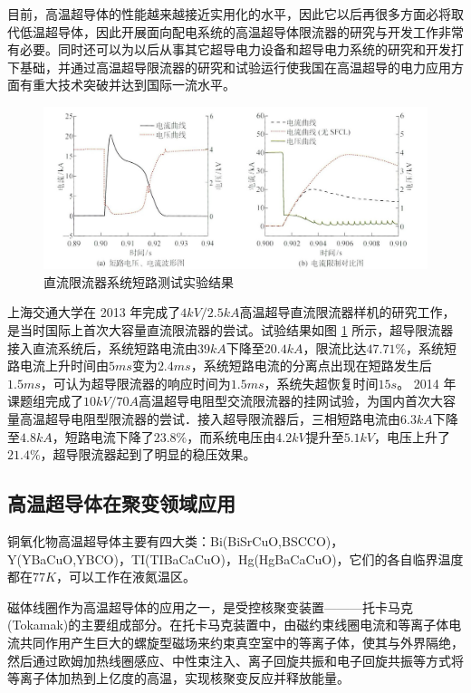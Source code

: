 \documentclass[UTF8, twocolumn]{ctexart}
\begin{document}
    目前，高温超导体的性能越来越接近实用化的水平，因此它以后再很多方面必将取代低温超导体，因此开展面向配电系统的高温超导体限流器的研究与开发工作非常有必要。同时还可以为以后从事其它超导电力设备和超导电力系统的研究和开发打下基础，并通过高温超导限流器的研究和试验运行使我国在高温超导的电力应用方面有重大技术突破并达到国际一流水平\cite{肖立业1999超导限流器}。

    \begin{figure}[hb]
        \centering
        \includegraphics[scale=1.2]{image/直流限流器系统短路测试实验结果.jpg}
        \caption{直流限流器系统短路测试实验结果}
        \label{fig:image5}
    \end{figure}

    上海交通大学在 2013 年完成了$4kV/2.5kA$高温超导直流限流器样机的研究工作，是当时国际上首次大容量直流限流器的尝试。试验结果如图 \ref{fig:image5} 所示，超导限流器接入直流系统后，系统短路电流由$39kA$下降至$20.4kA$，限流比达$47.71\%$，系统短路电流上升时间由$5ms$变为$2.4ms$，系统短路电流的分离点出现在短路发生后$1.5ms$，可认为超导限流器的响应时间为$1.5ms$，系统失超恢复时间$15s$。 2014 年课题组完成了$10kV/70A$高温超导电阻型交流限流器的挂网试验，为国内首次大容量高温超导电阻型限流器的尝试．接入超导限流器后，三相短路电流由$6.3kA$下降至$4.8kA$，短路电流下降了$23.8\%$，而系统电压由$4.2kV$提升至$5.1kV$，电压上升了$21.4\%$，超导限流器起到了明显的稳压效果\cite{金之俭2018二代高温超导材料的应用技术与发展综述}。

    \subsection{高温超导体在聚变领域应用}

    铜氧化物高温超导体主要有四大类：Bi(BiSrCuO,BSCCO)，Y(YBaCuO,YBCO)，TI(TIBaCaCuO)，Hg(HgBaCaCuO)，它们的各自临界温度都在$77K$，可以工作在液氮温区。\cite{孙林煜2012第二代高温超导体研究与在聚变领域应用前景}

    磁体线圈作为高温超导体的应用之一，是受控核聚变装置———托卡马克(Tokamak)的主要组成部分。在托卡马克装置中，由磁约束线圈电流和等离子体电流共同作用产生巨大的螺旋型磁场来约束真空室中的等离子体，使其与外界隔绝，然后通过欧姆加热线圈感应、中性束注入、离子回旋共振和电子回旋共振等方式将等离子体加热到上亿度的高温，实现核聚变反应并释放能量。
\end{document}
